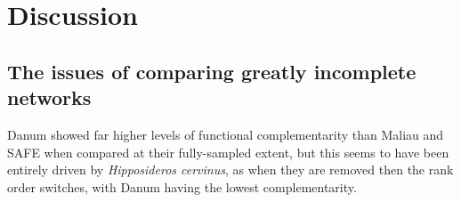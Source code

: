 \documentclass[]{article}
\begin{document}
\section{Discussion}\label{discussion}

\subsection{The issues of comparing greatly incomplete
networks}\label{the-issues-of-comparing-greatly-incomplete-networks}

Danum showed far higher levels of functional complementarity than Maliau
and SAFE when compared at their fully-sampled extent, but this seems to
have been entirely driven by \emph{Hipposideros cervinus}, as when they
are removed then the rank order switches, with Danum having the lowest
complementarity.
\end{document}
